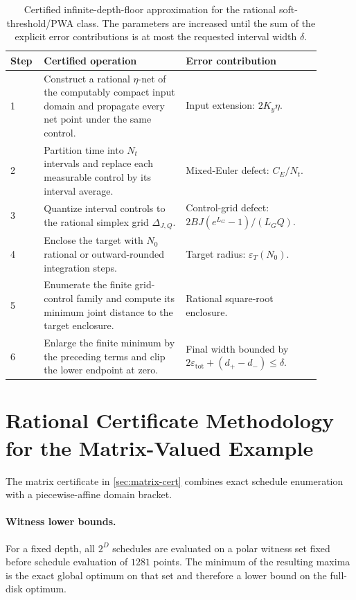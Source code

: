 \documentclass[twoside,11pt]{article}
\begin{document}
\begin{table}[t]
\centering
\caption{Certified infinite-depth-floor approximation for the rational soft-threshold/PWA class.  The parameters are increased until the sum of the explicit error contributions is at most the requested interval width $\delta$.}
\label{soft:tab:certified-floor}
\small
\begin{tabular}{Y{0.07\linewidth}Y{0.42\linewidth}Y{0.40\linewidth}}
\toprule
Step & Certified operation & Error contribution\\
 & Construct a rational $\eta$-net of the computably compact input domain and propagate every net point under the same control. & Input extension: $2K_y\eta$.\\
2 & Partition time into $N_t$ intervals and replace each measurable control by its interval average. & Mixed-Euler defect: $C_E/N_t$.\\
3 & Quantize interval controls to the rational simplex grid $\Delta_{J,Q}$. & Control-grid defect: $2BJ(e^{L_G}-1)/(L_GQ)$.\\
4 & Enclose the target with $N_0$ rational or outward-rounded integration steps. & Target radius: $\varepsilon_T(N_0)$.\\
5 & Enumerate the finite grid-control family and compute its minimum joint distance to the target enclosure. & Rational square-root enclosure.\\
6 & Enlarge the finite minimum by the preceding terms and clip the lower endpoint at zero. & Final width bounded by $2\varepsilon_{\mathrm{tot}}+(d_+-d_-)\le\delta$.\\
\bottomrule
\end{tabular}
\end{table}

\section{Rational Certificate Methodology for the Matrix-Valued Example}
\label{soft:app:pwa}

The matrix certificate in \cref{sec:matrix-cert} combines exact schedule enumeration with a piecewise-affine domain bracket.

\paragraph{Witness lower bounds.}
For a fixed depth, all $2^D$ schedules are evaluated on a polar witness set fixed before schedule evaluation of $1281$ points.  The minimum of the resulting maxima is the exact global optimum on that set and therefore a lower bound on the full-disk optimum.
\end{document}
